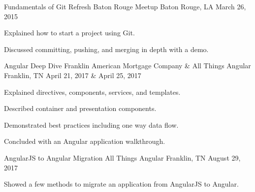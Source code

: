\documentclass[letterpaper]{awesome-cv}
\begin{document}
\begin{cventries}
  \cventry
    {Fundamentals of Git}
    {Refresh Baton Rouge Meetup}
    {Baton Rouge, LA}
    {March 26, 2015}
    {
      \begin{cvitems}
        \item {Explained how to start a project using Git.}
        \item {Discussed committing, pushing, and merging in depth with a demo.}
      \end{cvitems}
    }

  \cventry
    {Angular Deep Dive}
    {Franklin American Mortgage Company \& All Things Angular}
    {Franklin, TN}
    {April 21, 2017 \& April 25, 2017}
    {
      \begin{cvitems}
        \item {Explained directives, components, services, and templates.}
        \item {Described container and presentation components.}
        \item {Demonstrated best practices including one way data flow.}
        \item {Concluded with an Angular application walkthrough.}
      \end{cvitems}
    }

  \cventry
    {AngularJS to Angular Migration}
    {All Things Angular}
    {Franklin, TN}
    {August 29, 2017}
    {
      \begin{cvitems}
        \item {Showed a few methods to migrate an application from AngularJS to Angular.}
      \end{cvitems}
    }
\end{cventries}
\end{document}
